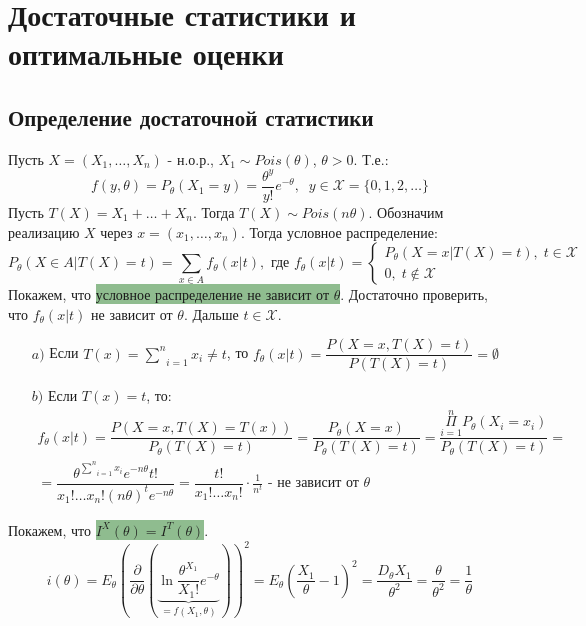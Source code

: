 \chapter{Достаточные статистики и оптимальные оценки}\label{cha:7}
\section{Определение достаточной статистики}\label{cha:7/sec:1}

\begin{example}\label{cha:7/sec:1/example:1}
	Пусть $X = (X_1, \dots, X_n)$ - н.о.р., $X_1 \sim Pois (\theta)$, $\theta > 0$. Т.е.: 
	$$f(y, \theta) = P_{\theta}(X_1 = y) = \frac{\theta^y}{y!} e^{-\theta}, \;\; y \in \mathcal{X} = \{0, 1, 2, \dots\}$$
	Пусть $T(X) = X_1 + \dots + X_n$. Тогда $T(X) \sim Pois (n \theta)$. Обозначим реализацию $X$ через $x = (x_1, \dots, x_n)$. Тогда условное распределение:
	$$P_{\theta} \left( X \in A | T(X) = t \right) = \underset{x \in A}{\overset{}{\sum}}f_{\theta} (x| t), \text{ где } f_{\theta}(x|t) = \begin{cases}
		P_{\theta}\left( X = x | T(X) = t \right), \; t \in \mathcal{X} \\
		0, \; t \not \in \mathcal{X}
	\end{cases}$$
	Покажем, что \colorbox{DarkSeaGreen}{условное распределение не зависит от $\theta$}. Достаточно проверить, что $f_{\theta} (x|t)$ не зависит от $\theta$. Дальше $t \in \mathcal{X}$.
	\begin{itemize}
		\item[$a)$] 
			Если $T(x) = \underset{i=1}{\overset{n}{\sum}}x_i \not = t$, то $\displaystyle f_{\theta}(x|t) = \dfrac{P\left( X = x, T(X) = t \right)}{P(T(X) = t)} = \emptyset$
		\item[$b)$]
			Если $T(x) = t$, то:
			$$\begin{gathered}
				f_{\theta}(x|t) = \dfrac{P\left( X = x, T(X) = T(x) \right)}{P_{\theta}(T(X) = t)} = \dfrac{P_{\theta}(X = x)}{P_{\theta}(T(X) = t)} = \dfrac{\underset{i=1}{\overset{n}{\Pi}}P_{\theta}(X_i = x_i)}{P_{\theta}(T(X) = t)} = \\
				= \dfrac{\theta^{\underset{i=1}{\overset{n}{\sum}}x_i} e^{-n \theta} t!}{x_1! \dots x_n! (n \theta)^t e^{-n \theta}} = \dfrac{t!}{x_1! \dots x_n !} \cdot \frac{1}{n^t} \text{ - не зависит от } \theta
			\end{gathered}$$
	\end{itemize}
	Покажем, что \colorbox{DarkSeaGreen}{$I^X (\theta) = I^T (\theta)$}.
	$$i (\theta) = E_{\theta} \left( \frac{\partial}{\partial \theta} \left( \underbrace{\ln \frac{\theta^{X_1}}{X_1!} e^{-\theta}}_{= f(X_1, \theta)} \right) \right)^2 = E_{\theta} \left( \frac{X_1}{\theta} - 1 \right)^2 = \frac{D_{\theta} X_1}{\theta^2} = \frac{\theta}{\theta^2} = \frac{1}{\theta}$$

\end{example}
